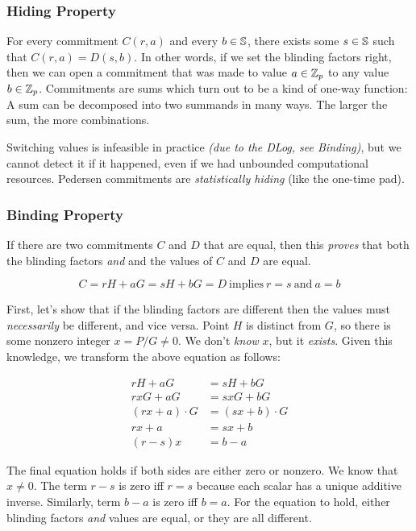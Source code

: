 \subsubsection{Hiding Property}

For every commitment $C(r, a)$ and every $b \in \mathbb{S}$,
there exists some $s \in \mathbb{S}$ such that $C(r, a) = D(s, b)$.
In other words,
if we set the blinding factors right,
then we can open a commitment that was made to value $a \in \mathbb{Z}_p$ to any value $b \in \mathbb{Z}_p$.
%
Commitments are sums which turn out to be a kind of one-way function:
A sum can be decomposed into two summands in many ways.
The larger the sum, the more combinations.

Switching values is infeasible in practice \emph{(due to the DLog, see Binding)},
but we cannot detect it if it happened,
even if we had unbounded computational resources.
Pedersen commitments are \emph{statistically hiding} (like the one-time pad).

\subsubsection{Binding Property}

If there are two commitments $C$ and $D$ that are equal,
then this \emph{proves} that both the blinding factors \emph{and} and the values of $C$ and $D$ are equal.

\[
    C = rH + aG = sH + bG = D\ \text{implies}\ r = s\ \text{and}\ a = b
\]

First, let's show that if the blinding factors are different then the values must \emph{necessarily} be different, and vice versa.
Point $H$ is distinct from $G$, so there is some nonzero integer $x = P / G \neq 0$.
We don't \emph{know} $x$, but it \emph{exists}.
Given this knowledge, we transform the above equation as follows:

\begin{align*}
    rH + aG &= sH + bG\\
    rxG + aG &= sxG + bG\\
    (rx + a)\cdot G &= (sx+b) \cdot G\\
    rx + a &= sx+b\\
    (r-s)x &= b-a
\end{align*}

The final equation holds if both sides are either zero or nonzero.
We know that $x \neq 0$.
The term $r - s$ is zero iff $r = s$ because each scalar has a unique additive inverse.
Similarly, term $b - a$ is zero iff $b = a$.
For the equation to hold,
either blinding factors \emph{and} values are equal, or they are all different.

